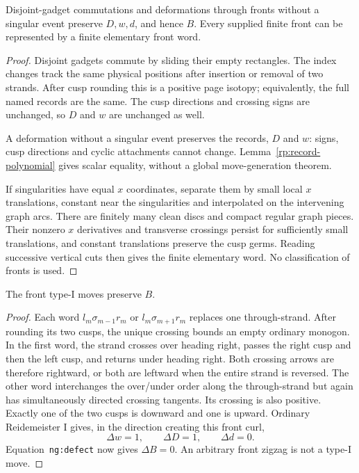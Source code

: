 \begin{lemma}
\label{ng:commutation}\leanok
Disjoint-gadget commutations and deformations through fronts without a
singular event preserve $D,w,d$, and hence $B$. Every supplied finite
front can be represented by a finite elementary front word.

\end{lemma}
\begin{proof}\leanok{}
Disjoint gadgets commute by sliding their empty rectangles. The index
changes track the same physical positions after insertion or removal of
two strands. After cusp rounding this is a positive page isotopy;
equivalently, the full named records are the same. The cusp directions
and crossing signs are unchanged, so $D$ and $w$ are unchanged as well.

A deformation without a singular event preserves the records, $D$ and
$w$: signs, cusp directions and cyclic attachments cannot change.
Lemma~\ref{rp:record-polynomial} gives scalar equality, without a global
move-generation theorem.

If singularities have equal $x$ coordinates, separate them by small local
$x$ translations, constant near the singularities and interpolated on
the intervening graph arcs. There are finitely many clean discs and
compact regular graph pieces. Their nonzero $x$ derivatives and
transverse crossings persist for sufficiently small translations, and
constant translations preserve the cusp germs. Reading successive
vertical cuts then gives the finite elementary word. No classification
of fronts is used.
\end{proof}

\begin{lemma}\label{ng:front-I}\leanok
The front type-I moves preserve $B$.

\end{lemma}
\begin{proof}\leanok
Each word $l_m\sigma_{m-1}r_m$ or $l_m\sigma_{m+1}r_m$ replaces one
through-strand. After rounding its two cusps, the unique crossing bounds
an empty ordinary monogon. In the first word, the strand crosses over
heading right, passes the right cusp and then the left cusp, and returns
under heading right. Both crossing arrows are therefore rightward, or
both are leftward when the entire strand is reversed. The other word
interchanges the over/under order along the through-strand but again
has simultaneously directed crossing tangents. Its crossing is also
positive. Exactly one of the two cusps is downward and one is upward.
Ordinary Reidemeister I gives, in the direction creating this front curl,
\begin{equation}\label{ng:type-I-counts}
 \Delta w=1,\qquad \Delta D=1,\qquad \Delta d=0.
\end{equation}
Equation~\texttt{ng:defect} now gives $\Delta B=0$.
An arbitrary front zigzag is not a type-I move.
\end{proof}

